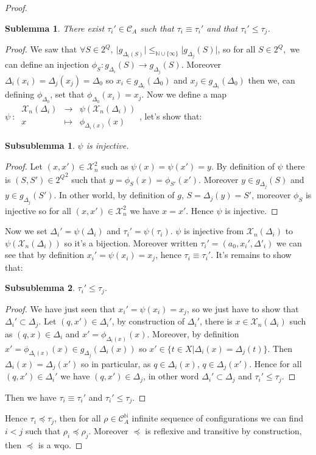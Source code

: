 \documentclass[a4paper,10pt]{report}
\newtheorem{slm}{Sublemma}[lm]
\newtheorem{sslm}{Subsublemma}[slm]
\newcommand{\dmap}[5]{
#1~:~\begin{array}{ccccc}
#2 &\to& #3 \\
#4  &\mapsto& #5
\end{array}}
\newcommand{\C}{\mathcal{C}_{A}}
\newcommand{\X}{\mathcal{X}_{n}}
\begin{document}
\begin {proof}
\begin{slm}
  There exist $\tau_i' \in \C$ such that $\tau_i \equiv \tau_i'$ and that  $\tau_i' \leq \tau_j$.
\end{slm}
\begin{proof}
We saw that $\forall S \in 2^Q,\ \lvert g_{\Delta_i(S)} \lvert \leq_{\mathbb N \cup \{\infty\}} \lvert g_{\Delta_j}(S) \lvert$, 
so for all $S \in 2^Q,$ we can define an injection $\phi_S: g_{\Delta_i}(S) \to g_{\Delta_j}(S)$. 
Moreover $\Delta_i(x_i)=\Delta_j(x_j)=\Delta_0$ so $x_i \in g_{\Delta_i}(\Delta_0)$ and $x_j \in g_{\Delta_i}(\Delta_0) $ then we, can defining $\phi_{\Delta_0}$, set that $\phi_{\Delta_0}(x_i)=x_j$.
Now we define a map $\dmap{\psi}{\X(\Delta_i)}{\psi(\X(\Delta_i))}{x}{\phi_{\Delta_i(x)}(x)}$, let's show that:
\begin{sslm}
  $\psi$ is injective.
\end{sslm}
\begin{proof}
Let $(x,x') \in \X^2$ such as $\psi(x)=\psi(x')=y$.
By definition of $\psi$ there is $(S,S')\in {2^Q}^2$ such that  $y=\phi_S(x)=\phi_{S'}(x')$. Moreover $y\in g_{\Delta_j}(S)$ and  $y\in g_{\Delta_j}(S')$. In other world, by definition of $g$,
$S=\Delta_j(y)=S'$, moreover $\phi_S$ is injective so for all $(x,x') \in \X^2 $ we have $ x=x'$.
Hence $\psi$ is injective.
\end{proof}
Now we set $\Delta_i'=\psi (\Delta_i)$ and $\tau_i'=\psi (\tau_i)$. 
$\psi$ is injective from $\X(\Delta_i)$ to $\psi(\X(\Delta_i))$ so it's a bijection.
Moreover written $ \tau_i'=(a_0,x_i',\Delta'_i)$ we can see that by definition $ x_i'=\psi(x_i)=x_j$, hence $\tau_i \equiv \tau_i'$.
It's remains to show that:
\begin{sslm}
  $\tau_i' \leq \tau_j$.
\end{sslm}

\begin{proof}
  We have just seen that $ x_i'=\psi(x_i)=x_j$, so we just have to show that $\Delta_i' \subset \Delta_j$.
  Let $(q,x') \in \Delta_i'$, by construction of $\Delta_i'$, there is $x \in \X(\Delta_i)$ such as $(q,x) \in \Delta_i$ and $x'=\phi_{\Delta_i(x)}(x)$.
  Moreover, by definition $x'=\phi_{\Delta_i(x)}(x) \in g_{\Delta_j}(\Delta_i(x))$ so $ x' \in \{ t \in X | \Delta_i(x)=\Delta_j(t) \}$.
  Then $\Delta_i(x)=\Delta_j(x')$ so in particular, as $q \in \Delta_i(x)$, $q \in \Delta_j(x')$.
  Hence for all $(q,x') \in \Delta_i'$ we have $(q,x') \in \Delta_j$, in other word $\Delta_i' \subset \Delta_j$ and $\tau_i' \leq \tau_j$.
\end{proof}
Then we have $\tau_i \equiv \tau_i'$ and  $\tau_i' \leq \tau_j$.
\end{proof}	
Hence $\tau_i \preceq \tau_j$, then for all $\rho \in \C^{\mathbb N}$ infinite sequence of configurations we can find $i < j$ such that $\rho_i \preceq \rho_j$.
Moreover $\preceq$ is reflexive and transitive by construction, then $\preceq$ is a wqo.

\end{proof}
\end{document}
